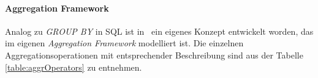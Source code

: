 \paragraph{Aggregation Framework}\label{aggrFr}

Analog zu \textit{GROUP BY} in SQL ist in \mongo\ ein eigenes Konzept entwickelt worden, das im eigenen \textit{Aggregation Framework} modelliert ist. Die einzelnen Aggregationsoperationen mit entsprechender Beschreibung sind aus der Tabelle \ref{table:aggrOperators} zu entnehmen. %

%

